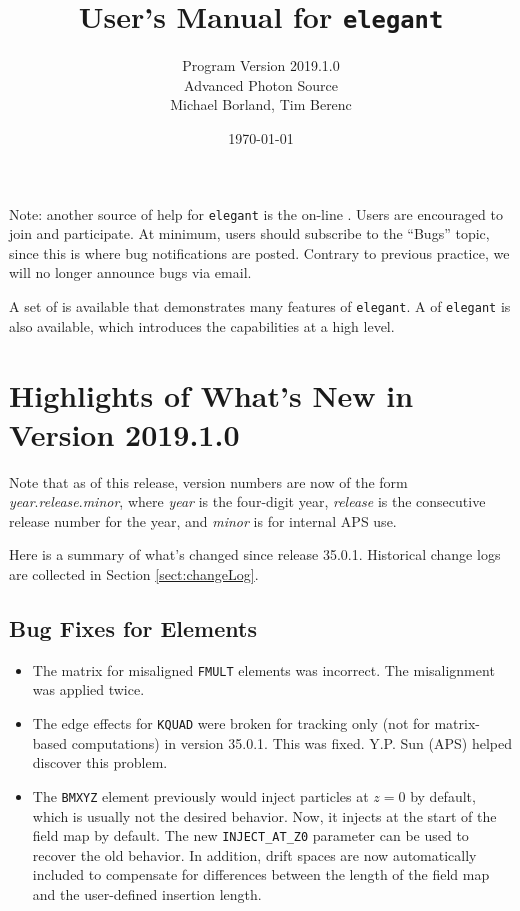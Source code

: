 \documentclass[11pt]{article}
\begin{document}
\title{User's Manual for {\tt elegant}}
\author{Program Version 2019.1.0\\Advanced Photon Source\\Michael Borland, Tim Berenc\\ \date{\today}}
\maketitle

Note: another source of help for {\tt elegant} is the on-line
.
Users are encouraged to join and participate.  At minimum, users should subscribe to the ``Bugs'' topic,
since this is where bug notifications are posted.  Contrary to previous practice, we will no longer announce
bugs via email.

A set of  is
available that demonstrates many features of {\tt elegant}.  A  of {\tt elegant} is also available, which introduces the capabilities
at a high level.

\section{Highlights of What's New in Version 2019.1.0}

Note that as of this release, version numbers are now of the form {\em year}.{\em release}.{\em minor},
where {\em year} is the four-digit year, {\em release} is the consecutive release number for the year,
and {\em minor} is for internal APS use.

Here is a summary of what's changed since release 35.0.1.
Historical change logs are collected in Section \ref{sect:changeLog}.

\subsection{Bug Fixes for Elements}

\begin{itemize}
\item The matrix for misaligned \verb|FMULT| elements was incorrect. The misalignment was applied twice.
\item The edge effects for \verb|KQUAD| were broken for tracking only (not for matrix-based computations)
  in version 35.0.1. This was fixed.  Y.P. Sun (APS) helped discover this problem.
\item The \verb|BMXYZ| element previously would inject particles at $z=0$ by default, which is usually not
  the desired behavior. Now, it injects at the start of the field map by default. The new \verb|INJECT_AT_Z0|
  parameter can be used to recover the old behavior. In addition, drift spaces are now automatically included
  to compensate for differences between the length of the field map and the user-defined insertion length.
\end{itemize}
\end{document}
